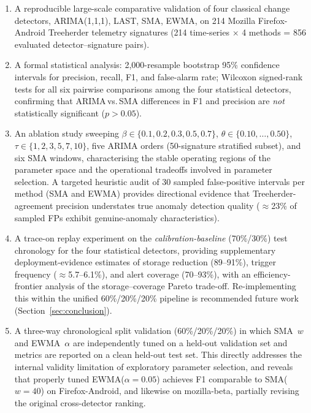 \documentclass[a4paper,fleqn]{cas-sc}
\theoremstyle{plain}
\begin{document}
\begin{enumerate}
  \item A reproducible large-scale comparative validation of four classical
    change detectors, ARIMA(1,1,1), LAST, SMA, EWMA, on 214 Mozilla
    Firefox-Android Treeherder telemetry signatures
    (214 time-series $\times$ 4 methods = 856 evaluated detector--signature pairs).
  \item A formal statistical analysis: 2,000-resample bootstrap 95\% confidence
    intervals for precision, recall, F1, and false-alarm rate; Wilcoxon
    signed-rank tests for all six pairwise comparisons among the four
    statistical detectors, confirming that ARIMA\,vs.\,SMA differences in
    F1 and precision are \emph{not} statistically significant ($p > 0.05$).
  \item An ablation study sweeping $\beta \in \{0.1,0.2,0.3,0.5,0.7\}$,
    $\theta \in \{0.10,\ldots,0.50\}$, $\tau \in \{1,2,3,5,7,10\}$,
    five ARIMA orders (50-signature stratified subset), and six SMA windows,
    characterising the stable operating
    regions of the parameter space and the operational tradeoffs involved
    in parameter selection.
    A targeted heuristic audit of 30 sampled false-positive intervals per
    method (SMA and EWMA) provides directional evidence that
    Treeherder-agreement precision understates true anomaly detection quality
    ($\approx$23\% of sampled FPs exhibit genuine-anomaly characteristics).
  \item A trace-on replay experiment on the \emph{calibration-baseline}
    (70\%/30\%) test chronology for the four statistical detectors,
    providing supplementary deployment-evidence estimates of
    storage reduction (89--91\%), trigger frequency ($\approx$5.7--6.1\%),
    and alert coverage (70--93\%), with an efficiency-frontier
    analysis of the storage--coverage Pareto trade-off.
    Re-implementing this within the unified 60\%/20\%/20\% pipeline
    is recommended future work (Section~\ref{sec:conclusion}).
  \item A three-way chronological split validation (60\%/20\%/20\%) in which
    SMA~$w$ and EWMA~$\alpha$ are independently tuned on a held-out
    validation set and metrics are reported on a clean held-out test set.
    This directly addresses the internal validity limitation of
    exploratory parameter selection, and reveals that properly tuned
    EWMA($\alpha=0.05$) achieves F1 comparable to SMA($w=40$) on
    Firefox-Android, and likewise on mozilla-beta, partially
    revising the original cross-detector ranking.

\end{enumerate}
\end{document}
